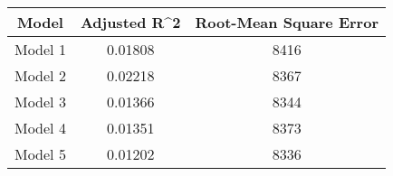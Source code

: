 \documentclass[]{article}
\begin{document}
\begin{longtable}[]{@{}ccc@{}}
\toprule
\begin{minipage}[b]{0.13\columnwidth}\centering\strut
Model\strut
\end{minipage} & \begin{minipage}[b]{0.19\columnwidth}\centering\strut
Adjusted R\^{}2\strut
\end{minipage} & \begin{minipage}[b]{0.30\columnwidth}\centering\strut
Root-Mean Square Error\strut
\end{minipage}\tabularnewline
\midrule
\endhead
\begin{minipage}[t]{0.13\columnwidth}\centering\strut
Model 1\strut
\end{minipage} & \begin{minipage}[t]{0.19\columnwidth}\centering\strut
0.01808\strut
\end{minipage} & \begin{minipage}[t]{0.30\columnwidth}\centering\strut
8416\strut
\end{minipage}\tabularnewline
\begin{minipage}[t]{0.13\columnwidth}\centering\strut
Model 2\strut
\end{minipage} & \begin{minipage}[t]{0.19\columnwidth}\centering\strut
0.02218\strut
\end{minipage} & \begin{minipage}[t]{0.30\columnwidth}\centering\strut
8367\strut
\end{minipage}\tabularnewline
\begin{minipage}[t]{0.13\columnwidth}\centering\strut
Model 3\strut
\end{minipage} & \begin{minipage}[t]{0.19\columnwidth}\centering\strut
0.01366\strut
\end{minipage} & \begin{minipage}[t]{0.30\columnwidth}\centering\strut
8344\strut
\end{minipage}\tabularnewline
\begin{minipage}[t]{0.13\columnwidth}\centering\strut
Model 4\strut
\end{minipage} & \begin{minipage}[t]{0.19\columnwidth}\centering\strut
0.01351\strut
\end{minipage} & \begin{minipage}[t]{0.30\columnwidth}\centering\strut
8373\strut
\end{minipage}\tabularnewline
\begin{minipage}[t]{0.13\columnwidth}\centering\strut
Model 5\strut
\end{minipage} & \begin{minipage}[t]{0.19\columnwidth}\centering\strut
0.01202\strut
\end{minipage} & \begin{minipage}[t]{0.30\columnwidth}\centering\strut
8336\strut
\end{minipage}\tabularnewline
\bottomrule
\end{longtable}
\end{document}
